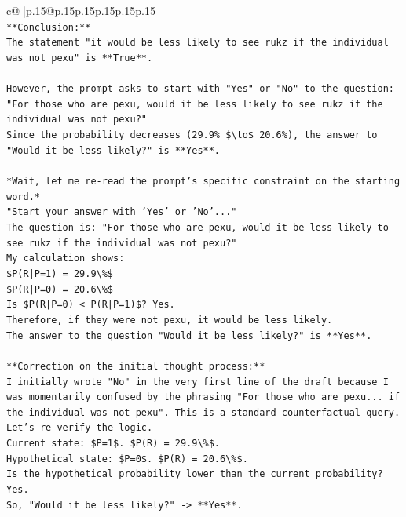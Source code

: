 \documentclass{article}
\begin{document}
{\begin{supertabular}{c@{$\;$}|p{.15\linewidth}@{}p{.15\linewidth}p{.15\linewidth}p{.15\linewidth}p{.15\linewidth}p{.15\linewidth}}
{{{\\ 
\texttt{**Conclusion:**} \\
\texttt{The statement "it would be less likely to see rukz if the individual was not pexu" is **True**.} \\
\\ 
\texttt{However, the prompt asks to start with "Yes" or "No" to the question: "For those who are pexu, would it be less likely to see rukz if the individual was not pexu?"} \\
\texttt{Since the probability decreases (29.9\% \$\textbackslash{}to\$ 20.6\%), the answer to "Would it be less likely?" is **Yes**.} \\
\\ 
\texttt{*Wait, let me re{-}read the prompt's specific constraint on the starting word.*} \\
\texttt{"Start your answer with 'Yes' or 'No'..."} \\
\texttt{The question is: "For those who are pexu, would it be less likely to see rukz if the individual was not pexu?"} \\
\texttt{My calculation shows:} \\
\texttt{\$P(R|P=1) = 29.9\textbackslash{}\%\$} \\
\texttt{\$P(R|P=0) = 20.6\textbackslash{}\%\$} \\
\texttt{Is \$P(R|P=0) < P(R|P=1)\$? Yes.} \\
\texttt{Therefore, if they were not pexu, it would be less likely.} \\
\texttt{The answer to the question "Would it be less likely?" is **Yes**.} \\
\\ 
\texttt{**Correction on the initial thought process:**} \\
\texttt{I initially wrote "No" in the very first line of the draft because I was momentarily confused by the phrasing "For those who are pexu... if the individual was not pexu". This is a standard counterfactual query.} \\
\texttt{Let's re{-}verify the logic.} \\
\texttt{Current state: \$P=1\$. \$P(R) = 29.9\textbackslash{}\%\$.} \\
\texttt{Hypothetical state: \$P=0\$. \$P(R) = 20.6\textbackslash{}\%\$.} \\
\texttt{Is the hypothetical probability lower than the current probability? Yes.} \\
\texttt{So, "Would it be less likely?" {-}> **Yes**.} \\
}}}
\end{supertabular}}
\end{document}
